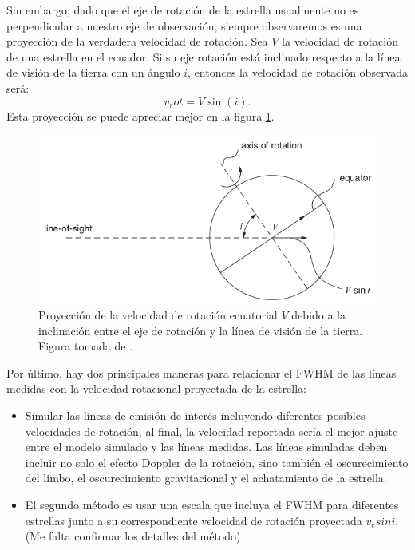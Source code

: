 \documentclass[notitlepage,letterpaper,12pt]{article} %
\begin{document}
Sin embargo, dado que el eje de rotación de la estrella usualmente no es perpendicular a nuestro eje de observación, siempre observaremos es una proyección de la verdadera velocidad de rotación. Sea $V$ la velocidad de rotación de una estrella en el ecuador. Si su eje rotación está inclinado respecto a la línea de visión de la tierra con un ángulo $i$, entonces la velocidad de rotación observada será:
\begin{equation}
v_rot = V \sin (i).
\end{equation}
Esta proyección se puede apreciar mejor en la figura \ref{proyeccion}.

\begin{figure}[h!]
  \centering
   \includegraphics[scale= 0.5]{V_sin_i.png}
  \caption{Proyección de la velocidad de rotación ecuatorial $V$ debido a la inclinación entre el eje de rotación y la línea de visión de la tierra. Figura tomada de \cite{book:590711}.}
  \label{proyeccion}
\end{figure}

Por último, hay dos principales maneras para relacionar el FWHM de las líneas medidas con la velocidad rotacional proyectada de la estrella:
\begin{itemize}
\item Simular las líneas de emisión de interés incluyendo diferentes posibles velocidades de rotación, al final, la velocidad reportada sería el mejor ajuste entre el modelo simulado y las líneas medidas. Las líneas simuladas deben incluir no solo el efecto Doppler de la rotación, sino también el oscurecimiento del limbo, el oscurecimiento gravitacional y el achatamiento de la estrella. \cite{Slettebak} \cite{syntetic}
\item El segundo método es usar una escala que incluya el FWHM para diferentes estrellas junto a su correspondiente velocidad de rotación proyectada $v_e sin i$. (Me falta confirmar los detalles del método) %
\end{itemize} 
\end{document}
